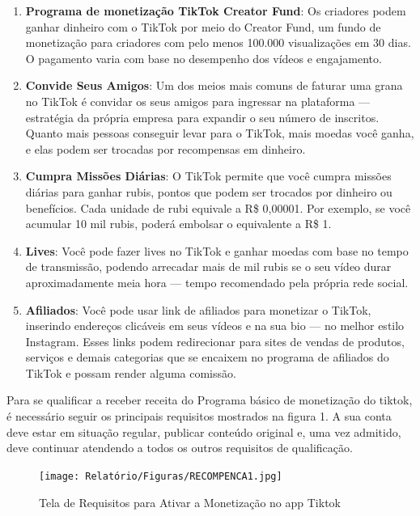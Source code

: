 \begin{enumerate}
    \item \textbf{Programa de monetização TikTok Creator Fund}: Os criadores podem ganhar dinheiro com o TikTok por meio do Creator Fund, um fundo de monetização para criadores com pelo menos 100.000 visualizações em 30 dias. O pagamento varia com base no desempenho dos vídeos e engajamento.

\item \textbf{Convide Seus Amigos}: Um dos meios mais comuns de faturar uma grana no TikTok é convidar os seus amigos para ingressar na plataforma — estratégia da própria empresa para expandir o seu número de inscritos. Quanto mais pessoas conseguir levar para o TikTok, mais moedas você ganha, e elas podem ser trocadas por recompensas em dinheiro.

\item \textbf{Cumpra Missões Diárias}: O TikTok permite que você cumpra missões diárias para ganhar rubis, pontos que podem ser trocados por dinheiro ou benefícios. Cada unidade de rubi equivale a R\$ 0,00001. Por exemplo, se você acumular 10 mil rubis, poderá embolsar o equivalente a R\$ 1.

\item \textbf{Lives}:
Você pode fazer lives no TikTok e ganhar moedas com base no tempo de transmissão, podendo arrecadar mais de mil rubis se o seu vídeo durar aproximadamente meia hora — tempo recomendado pela própria rede social.

\item \textbf{Afiliados}: Você pode usar link de afiliados para monetizar o TikTok, inserindo endereços clicáveis em seus vídeos e na sua bio — no melhor estilo Instagram. Esses links podem redirecionar para sites de vendas de produtos, serviços e demais categorias que se encaixem no programa de afiliados do TikTok e possam render alguma comissão.
\end{enumerate}


Para se qualificar a receber receita do Programa básico de monetização do tiktok, é necessário seguir os principais requisitos mostrados na figura 1. A sua conta deve estar em situação regular, publicar conteúdo original e, uma vez admitido, deve continuar atendendo a todos os outros requisitos de qualificação.


\begin{figure}[H]
    \centering
    \texttt{[image: Relatório/Figuras/RECOMPENCA1.jpg]}
    \caption{Tela de Requisitos para Ativar a Monetização no app Tiktok}
    \label{fig:enter-label2} 
\end{figure}

